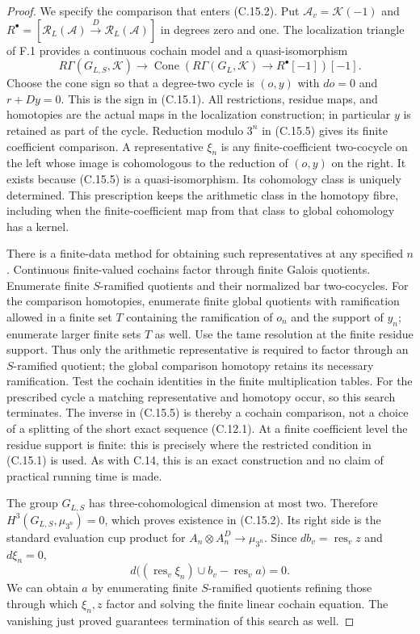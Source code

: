 \begin{proof}
We specify the comparison that enters (C.15.2).
Put $\mathcal A_v=\mathcal K(-1)$ and
$R^\bullet=[\mathcal R_L(\mathcal A)
                     \xrightarrow{D}\mathcal R_L(\mathcal A)]$
in degrees zero and one. The localization triangle of F.1
provides a continuous cochain model and a quasi-isomorphism
\[
 R\Gamma(G_{L,S},\mathcal K)
 \longrightarrow
 \operatorname{Cone}\!\left(
   R\Gamma(G_L,\mathcal K)\longrightarrow R^\bullet[-1]
                         \right)[-1].                       \tag{C.15.5}
\]
Choose the cone sign so that a degree-two cycle is
$(o,y)$ with $do=0$ and $r+Dy=0$. This is the sign in
(C.15.1). All restrictions, residue maps, and homotopies
are the actual maps in the localization construction;
in particular $y$ is retained as part of the cycle.
Reduction modulo $3^n$ in (C.15.5) gives its finite
coefficient comparison. A representative $\xi_n$ is
any finite-coefficient two-cocycle on the left whose
image is cohomologous to the reduction of $(o,y)$ on
the right. It exists because (C.15.5) is a
quasi-isomorphism. Its cohomology class is uniquely
determined. This prescription keeps the arithmetic
class in the homotopy fibre, including when the
finite-coefficient map from that class to global
cohomology has a kernel.

There is a finite-data method for obtaining such
representatives at any specified $n$. Continuous
finite-valued cochains factor through finite Galois
quotients. Enumerate finite $S$-ramified quotients
and their normalized bar two-cocycles. For the
comparison homotopies, enumerate finite global
quotients with ramification allowed in a finite
set $T$ containing the ramification of $o_n$ and
the support of $y_n$; enumerate larger finite
sets $T$ as well. Use the tame resolution at the
finite residue support. Thus only the arithmetic
representative is required to factor through an
$S$-ramified quotient; the global comparison
homotopy retains its necessary ramification.
Test the cochain
identities in the finite multiplication tables.
For the prescribed cycle a matching representative
and homotopy occur, so this search terminates.
The inverse in (C.15.5) is thereby a cochain
comparison, not a choice of a splitting of the
short exact sequence (C.12.1).
At a finite coefficient level the residue support
is finite: this is precisely where the restricted
condition in (C.15.1) is used. As with C.14, this
is an exact construction and no claim of practical
running time is made.

The group $G_{L,S}$ has three-cohomological dimension
at most two. Therefore $H^3(G_{L,S},\mu_{3^n})=0$,
which proves existence in (C.15.2). Its right side
is the standard evaluation cup product for
$A_n\otimes A_n^D\to\mu_{3^n}$. Since
$db_v=\operatorname{res}_v z$ and $d\xi_n=0$,
\[
 d\bigl((\operatorname{res}_v\xi_n)\cup b_v
                         -\operatorname{res}_v a\bigr)=0.
\]
We can obtain $a$ by enumerating finite $S$-ramified
quotients refining those through which $\xi_n,z$
factor and solving the finite linear cochain
equation. The vanishing just proved guarantees
termination of this search as well.


\end{proof}
